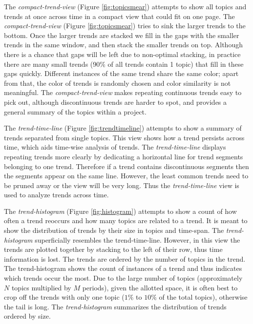 \documentclass[times, 10pt,twocolumn]{article}
\begin{document}
 The \emph{compact-trend-view} (Figure \ref{fig:topicsmear})
  attempts to show all topics and trends at once across time in a
  compact view that could fit on one page.   The
\emph{compact-trend-view} (Figure \ref{fig:topicsmear}) tries to sink
the larger trends to the bottom.  Once the larger trends are stacked
we fill in the gaps with the smaller trends in the same window, and
then stack the smaller trends on top.  Although there is a chance that
gaps will be left due to non-optimal stacking, in practice there are
many small trends (90\% of all trends contain 1 topic) that fill in
these gaps quickly.  Different instances of the same trend share the
same color; apart from that, the color of trends is randomly chosen
and color similarity is not meaningful.  
The \emph{compact-trend-view} makes repeating
continuous trends easy to pick out, although discontinuous trends are
harder to spot, and provides a general summary of the topics within a project.

The \emph{trend-time-line} (Figure \ref{fig:trendtimeline})
attempts to show a summary of trends separated from single topics. This view shows how a trend persists across time, which aids time-wise analysis of trends.
The \emph{trend-time-line} displays repeating trends more clearly by
dedicating a horizontal line for trend segments belonging to one
trend. Therefore if a trend contains discontinuous segments then
the segments appear on the same line.  However, the least common
trends need to be pruned away or the view will be very long. 
Thus the \emph{trend-time-line} view is used to analyze trends across time.

 The \emph{trend-histogram} (Figure \ref{fig:histogram}) attempts
  to show a count of how often a trend reoccurs and how many topics
  are related to a trend. It is meant to show the distribution of
  trends by their size in topics and time-span.  The
\emph{trend-histogram} superficially resembles the trend-time-line.
However, in this view the trends are plotted together by stacking to
the left of their row, thus time information is lost.  The trends are
ordered by the number of topics in the trend.  The trend-histogram
shows the count of instances of a trend and thus indicates which
trends occur the most. Due to the large number of topics
(approximately $N$ topics multiplied by $M$ periods), given the
allotted space, it is often best to crop off the trends with only one
topic ($1\%$ to $10\%$ of the total topics), otherwise the tail is
long. The \emph{trend-histogram} summarizes the distribution of
trends ordered by size.
\end{document}
